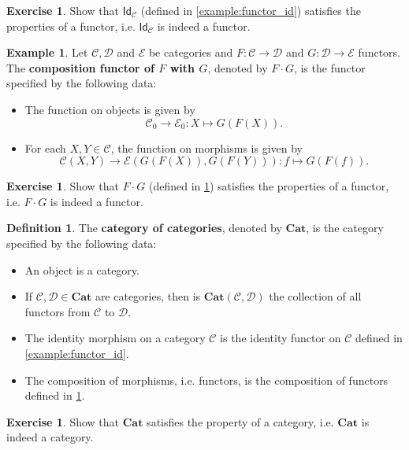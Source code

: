 \documentclass[a4paper,11pt, oneside,titlepage=false]{scrbook}
\theoremstyle{plain}
\theoremstyle{definition}
\newtheorem{dfn}[thm]{Definition}
\newtheorem{exa}[thm]{Example}
\newtheorem{exer}[thm]{Exercise}
\newcommand{\cfont}[1]{\ensuremath{\mathsf{#1}}}
\newcommand{\Cat}[1]{\mathcal{#1}}
\newcommand{\CC}{\Cat{C}}
\newcommand{\DD}{\Cat{D}}
\newcommand{\EE}{\Cat{E}}
\newcommand{\Catb}[1]{\mathbf{#1}}
\newcommand{\CAT}{\Catb{Cat}}
\newcommand{\Ob}[1]{{#1}_0}
\newcommand{\CHom}[3]{{#1}(#2,#3)}
\newcommand{\Id}[1][]{\cfont{Id}_{#1}}
\newcommand{\Comp}{\cdot}
\begin{document}
\begin{exer} Show that $\Id[\CC]$ (defined in \cref{example:functor_id}) satisfies the properties of a functor, i.e. $\Id[\CC]$ is indeed a functor.
\end{exer}

\begin{exa}\label{example:functor_comp} Let $\CC,\DD$ and $\EE$ be  categories and $F:\CC\to\DD$ and $G:\DD\to\EE$ functors. The \textbf{composition functor of $F$ with $G$}, denoted by $F\Comp G$, is the functor specified by the following data:
\begin{itemize}
\item The function on objects is given by
\[
\Ob{\CC}\to \Ob{\EE}: X\mapsto G(F(X)).
\]
\item For each $X,Y\in\CC$, the function on morphisms is given by
\[
\CHom \CC X Y\to \CHom{\EE}{G(F(X))}{G(F(Y))}: f\mapsto G(F(f)).
\]
\end{itemize}
\end{exa}

\begin{exer} Show that $F\Comp G$ (defined in \cref{example:functor_comp}) satisfies the properties of a functor, i.e. $F\Comp G$ is indeed a functor.
\end{exer}

\begin{dfn} The \textbf{category of categories}, denoted by $\CAT$, is the category specified by the following data:
\begin{itemize}
\item An object is a category.
\item If $\CC, \DD\in\CAT$ are categories, then is $\CHom \CAT \CC \DD$ the collection of all functors from $\CC$ to $\DD$.
\item The identity morphism on a category $\CC$ is the identity functor on $\CC$ defined in \cref{example:functor_id}.
\item The composition of morphisms, i.e. functors, is the composition of functors defined in \cref{example:functor_comp}.
\end{itemize} 
\end{dfn}

\begin{exer} Show that $\CAT$ satisfies the property of a category, i.e. $\CAT$ is indeed a category.
\end{exer}
\end{document}
